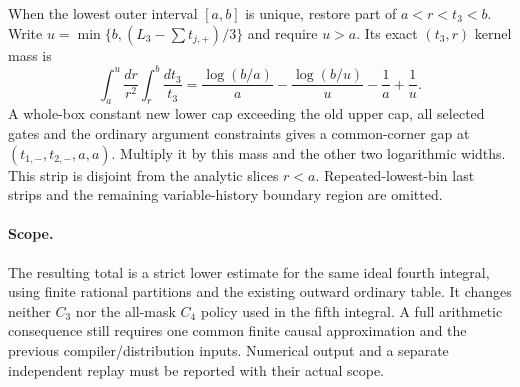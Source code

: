 When the lowest outer interval $[a,b]$ is unique, restore part of
$a<r<t_3<b$. Write
$u=\min\{b,(L_3-\sum t_{j,+})/3\}$ and require $u>a$.
Its exact $(t_3,r)$ kernel mass is
\[
 \int_a^u\frac{dr}{r^2}\int_r^b\frac{dt_3}{t_3}
 =\frac{\log(b/a)}a-\frac{\log(b/u)}u-\frac1a+\frac1u.
\]
A whole-box constant new lower cap exceeding the old upper cap,
all selected gates and the ordinary argument constraints gives a
common-corner gap at $(t_{1,-},t_{2,-},a,a)$. Multiply it by this
mass and the other two logarithmic widths. This strip is disjoint
from the analytic slices $r<a$. Repeated-lowest-bin last strips and
the remaining variable-history boundary region are omitted.

\paragraph{Scope.}
The resulting total is a strict lower estimate for the same ideal
fourth integral, using finite rational partitions and the existing
outward ordinary table. It changes neither $C_3$ nor the all-mask
$C_4$ policy used in the fifth integral. A full arithmetic consequence
still requires one common finite causal approximation and the
previous compiler/distribution inputs. Numerical output and a
separate independent replay must be reported with their actual scope.
